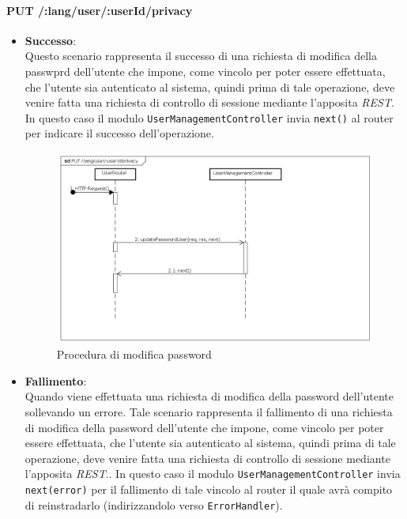 \paragraph{PUT /:lang/user/:userId/privacy}
\begin{itemize}
\item \textbf{Successo}:
\\
Questo scenario rappresenta il successo di una richiesta di modifica della passwprd dell'utente che impone, come vincolo per poter essere effettuata, che l'utente sia autenticato al sistema, quindi prima di tale operazione, deve venire fatta una richiesta di controllo di sessione mediante l'apposita \textit{REST}.  
In questo caso il modulo \texttt{UserManagementController} invia \texttt{next()} al router per indicare il successo dell'operazione.

\label{Procedura di modifica password}
\begin{figure}[ht]
	\centering
	\includegraphics[scale=0.40]{UML/DiagrammiDiSequenza/Back-end/PUT_LangUserUserIdPrivacySuccess.png}
	\caption{Procedura di modifica password}
\end{figure}
\FloatBarrier
\item \textbf{Fallimento}:
\\
Quando viene effettuata una richiesta di modifica della password dell'utente sollevando un errore. Tale scenario rappresenta il fallimento di una richiesta di modifica della password dell'utente che impone, come vincolo per poter essere effettuata, che l'utente sia autenticato al sistema, quindi prima di tale operazione, deve venire fatta una richiesta di controllo di sessione mediante l'apposita \textit{REST}.. In questo caso il modulo \texttt{UserManagementController} invia \texttt{next(error)} per il fallimento di tale vincolo al router il quale avrà compito di reinstradarlo (indirizzandolo verso \texttt{ErrorHandler}).




\end{itemize}
